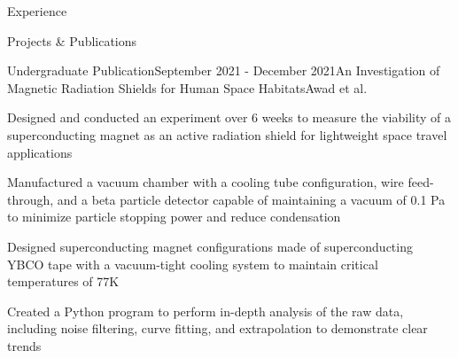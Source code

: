 \documentclass{resume} %
\begin{document}
\begin{rSection}{Experience}
\begin{comment}
\begin{rSubsection}{Department of National Defense - Engineering Intern}{May 2020 - September 2020}{}{}

\item Documented and presented key specifications on armored patrol vehicles for 411 vehicles in 69 variants
\item Reworked procurement documents based on technical requirements from multiple military bases
\item Proofread english-to-french translations of contracts to ensure correctness

\end{rSubsection}
\end{comment}
\end{rSection}

\begin{rSection}{Projects \& Publications}

\begin{rSubsection}{Undergraduate Publication}{September 2021 - December 2021}{An Investigation of Magnetic Radiation Shields for Human Space Habitats}{Awad et al.}
\item Designed and conducted an experiment over 6 weeks to measure the viability of a superconducting magnet as an active radiation shield for lightweight space travel applications
\item Manufactured a vacuum chamber with a cooling tube configuration, wire feed-through, and a beta particle detector capable of maintaining a vacuum of 0.1 Pa to minimize particle stopping power and reduce condensation
\item Designed superconducting magnet configurations made of superconducting YBCO tape with a vacuum-tight cooling system to maintain critical temperatures of 77K
\item Created a Python program to perform in-depth analysis of the raw data, including noise filtering, curve fitting, and extrapolation to demonstrate clear trends

\end{rSubsection}

\begin{comment}
\begin{rSubsection}{Co-Founder, PolyTwist Designs}{November 2015 - Present}{\url{www.polytwist.xyz}}{}
\item Co-founded a small business designing and manufacturing original Rubik's-Cube-style puzzles with unique mechanisms, challenges, and solutions using FDM 3D Printing and SolidWorks
\item Designed and manufactured several novel products end-to-end resulting in 16+ original designs
\item Created and maintained a website and online shop resulting in \$20,000 in sales of 16+ products over three years
\item Negotiated a partnership with Rubik's Brand Ltd. to mass-produce a product, involving the design stages to manufacturing through injection molding and packaging design


\end{comment}
\end{rSection}
\end{document}
